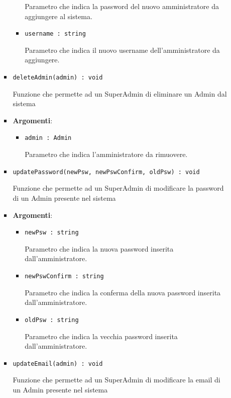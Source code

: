 \documentclass[../DefinizioneDiProdotto.tex]{subfiles}
\begin{document}
\begin{itemize}
\begin{itemize}
\begin{itemize}
\begin{itemize}
	 Parametro che indica la password del nuovo amministratore da aggiungere al sistema.
	\item \texttt{username : string}\

	 Parametro che indica il nuovo username dell'amministratore da aggiungere.
	\end{itemize}
	\end{itemize}\vspace{0.5em}
	\begin{itemize}
	\item \texttt{deleteAdmin(admin) : void}\

	 Funzione che permette ad un SuperAdmin di eliminare un Admin dal sistema

	\item \textbf{Argomenti}:
	\begin{itemize}
	\item \texttt{admin : Admin}\

	 Parametro che indica l'amministratore da rimuovere.
	\end{itemize}
	\end{itemize}\vspace{0.5em}
	\begin{itemize}
	\item \texttt{updatePassword(newPsw, newPswConfirm, oldPsw) : void}\

	 Funzione che permette ad un SuperAdmin di modificare la password di un Admin presente nel sistema

	\item \textbf{Argomenti}:
	\begin{itemize}
	\item \texttt{newPsw : string}\

	 Parametro che indica la nuova password inserita dall'amministratore.
	\item \texttt{newPswConfirm : string}\

	 Parametro che indica la conferma della nuova password inserita dall'amministratore.
	\item \texttt{oldPsw : string}\

	 Parametro che indica la vecchia password inserita dall'amministratore.
	\end{itemize}
	\end{itemize}\vspace{0.5em}
	\begin{itemize}
	\item \texttt{updateEmail(admin) : void}\

	 Funzione che permette ad un SuperAdmin di modificare la email di un Admin presente nel sistema


\end{itemize}
\end{itemize}
\end{itemize}
\end{document}
